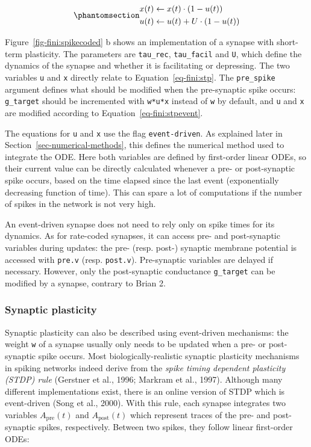 \documentclass[
  11pt,
  a4paper,
]{scrbook}
\begin{document}
\begin{equation}\phantomsection\label{eq-fini:stpevent}{
\begin{aligned}
x(t) &\leftarrow x(t) \cdot (1 - u(t))  \\
u(t) &\leftarrow u(t) + U \cdot (1 -u(t)) \\
\end{aligned}
}\end{equation}

Figure~\ref{fig-fini:spikecoded} b shows an implementation of a synapse
with short-term plasticity. The parameters are \texttt{tau\_rec},
\texttt{tau\_facil} and \texttt{U}, which define the dynamics of the
synapse and whether it is facilitating or depressing. The two variables
\texttt{u} and \texttt{x} directly relate to Equation~\ref{eq-fini:stp}.
The \texttt{pre\_spike} argument defines what should be modified when
the pre-synaptic spike occurs: \texttt{g\_target} should be incremented
with \texttt{w*u*x} instead of \texttt{w} by default, and \texttt{u} and
\texttt{x} are modified according to Equation~\ref{eq-fini:stpevent}.

The equations for \texttt{u} and \texttt{x} use the flag
\texttt{event-driven}. As explained later in
Section~\ref{sec-numerical-methods}, this defines the numerical method
used to integrate the ODE. Here both variables are defined by
first-order linear ODEs, so their current value can be directly
calculated whenever a pre- or post-synaptic spike occurs, based on the
time elapsed since the last event (exponentially decreasing function of
time). This can spare a lot of computations if the number of spikes in
the network is not very high.

An event-driven synapse does not need to rely only on spike times for
its dynamics. As for rate-coded synapses, it can access pre- and
post-synaptic variables during updates: the pre- (resp. post-) synaptic
membrane potential is accessed with \texttt{pre.v} (resp.
\texttt{post.v}). Pre-synaptic variables are delayed if necessary.
However, only the post-synaptic conductance \texttt{g\_target} can be
modified by a synapse, contrary to Brian 2.

\subsubsection*{Synaptic plasticity}\label{synaptic-plasticity}

Synaptic plasticity can also be described using event-driven mechanisms:
the weight \texttt{w} of a synapse usually only needs to be updated when
a pre- or post-synaptic spike occurs. Most biologically-realistic
synaptic plasticity mechanisms in spiking networks indeed derive from
the \emph{spike timing dependent plasticity (STDP) rule} (Gerstner et
al., 1996; Markram et al., 1997). Although many different
implementations exist, there is an online version of STDP which is
event-driven (Song et al., 2000). With this rule, each synapse
integrates two variables \(A_\text{pre}(t)\) and \(A_\text{post}(t)\)
which represent traces of the pre- and post-synaptic spikes,
respectively. Between two spikes, they follow linear first-order ODEs:
\end{document}

